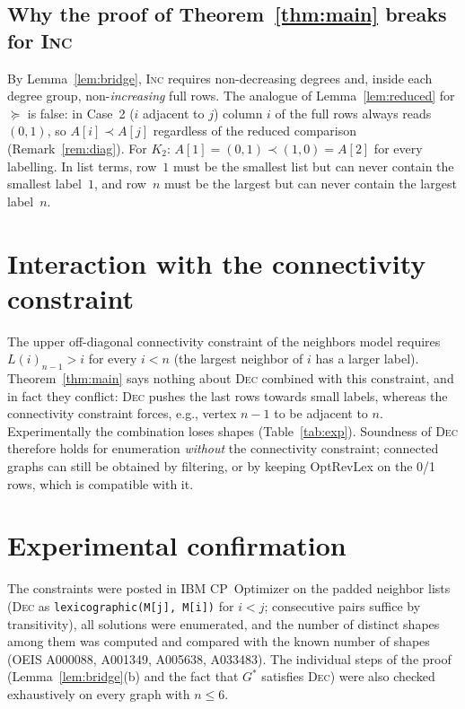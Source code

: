 \documentclass[11pt,a4paper]{article}
\theoremstyle{definition}
\theoremstyle{remark}
\newcommand{\slex}{\prec}
\newcommand{\Lst}{L}
\begin{document}
\subsection{Why the proof of Theorem~\ref{thm:main} breaks for \textsc{Inc}}

By Lemma~\ref{lem:bridge}, \textsc{Inc} requires non-decreasing degrees and, inside each degree
group, non-\emph{increasing} full rows. The analogue of Lemma~\ref{lem:reduced} for $\succeq$
is false: in Case~2 ($i$ adjacent to $j$) column $i$ of the full rows always reads $(0,1)$, so
$A[i]\slex A[j]$ regardless of the reduced comparison (Remark~\ref{rem:diag}). For $K_2$:
$A[1]=(0,1)\slex(1,0)=A[2]$ for every labelling. In list terms, row~$1$ must be the smallest
list but can never contain the smallest label~$1$, and row~$n$ must be the largest but can
never contain the largest label~$n$.

\section{Interaction with the connectivity constraint}

The upper off-diagonal connectivity constraint of the neighbors model requires
$\Lst(i)_{n-1}>i$ for every $i<n$ (the largest neighbor of $i$ has a larger label).
Theorem~\ref{thm:main} says nothing about \textsc{Dec} combined with this constraint, and in
fact they conflict: \textsc{Dec} pushes the last rows towards small labels, whereas the
connectivity constraint forces, e.g., vertex $n-1$ to be adjacent to $n$. Experimentally the
combination loses shapes (Table~\ref{tab:exp}). Soundness of \textsc{Dec} therefore holds for
enumeration \emph{without} the connectivity constraint; connected graphs can still be obtained
by filtering, or by keeping OptRevLex on the 0/1 rows, which is compatible with it.

\section{Experimental confirmation}\label{sec:exp}

The constraints were posted in IBM CP~Optimizer on the padded neighbor lists (\textsc{Dec} as
\texttt{lexicographic(M[j], M[i])} for $i<j$; consecutive pairs suffice by transitivity), all
solutions were enumerated, and the number of distinct shapes among them was computed and
compared with the known number of shapes (OEIS A000088, A001349, A005638, A033483).
The individual steps of the proof (Lemma~\ref{lem:bridge}(b) and the fact that $G^\ast$
satisfies \textsc{Dec}) were also checked exhaustively on every graph with $n\le6$.
\end{document}
